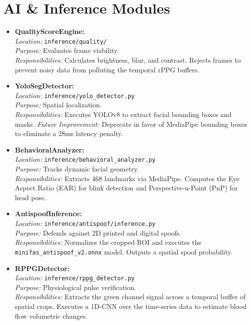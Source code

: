 \section{AI \& Inference Modules}
\begin{itemize}
    \item \textbf{QualityScoreEngine:} \\
    \textit{Location:} \texttt{inference/quality/} \\
    \textit{Purpose:} Evaluates frame viability. \\
    \textit{Responsibilities:} Calculates brightness, blur, and contrast. Rejects frames to prevent noisy data from polluting the temporal rPPG buffers.
    
    \item \textbf{YoloSegDetector:} \\
    \textit{Location:} \texttt{inference/yolo\_detector.py} \\
    \textit{Purpose:} Spatial localization. \\
    \textit{Responsibilities:} Executes YOLOv8 to extract facial bounding boxes and masks. \textit{Future Improvement:} Deprecate in favor of MediaPipe bounding boxes to eliminate a 28ms latency penalty.
    
    \item \textbf{BehavioralAnalyzer:} \\
    \textit{Location:} \texttt{inference/behavioral\_analyzer.py} \\
    \textit{Purpose:} Tracks dynamic facial geometry. \\
    \textit{Responsibilities:} Extracts 468 landmarks via MediaPipe. Computes the Eye Aspect Ratio (EAR) for blink detection and Perspective-n-Point (PnP) for head pose.
    
    \item \textbf{AntispoofInference:} \\
    \textit{Location:} \texttt{inference/antispoof/inference.py} \\
    \textit{Purpose:} Defends against 2D printed and digital spoofs. \\
    \textit{Responsibilities:} Normalizes the cropped ROI and executes the \texttt{minifas\_antispoof\_v2.onnx} model. Outputs a spatial spoof probability.
    
    \item \textbf{RPPGDetector:} \\
    \textit{Location:} \texttt{inference/rppg\_detector.py} \\
    \textit{Purpose:} Physiological pulse verification. \\
    \textit{Responsibilities:} Extracts the green channel signal across a temporal buffer of spatial crops. Executes a 1D-CNN over the time-series data to estimate blood flow volumetric changes.
    

\end{itemize}
